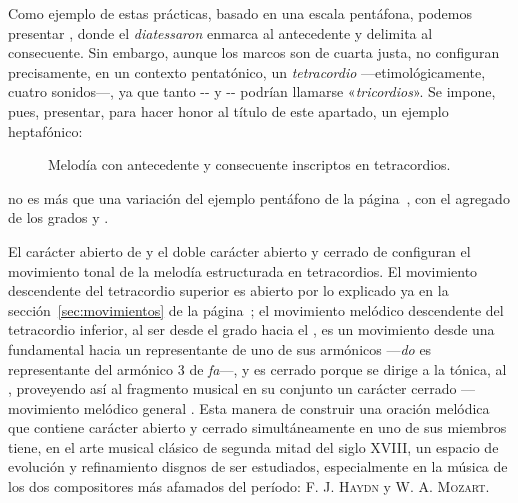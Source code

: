 \documentclass[a4paper,10pt]{article}
\begin{document}
\begin{multicols}{2}
  Como ejemplo de estas prácticas, basado en una escala pentáfona, podemos presentar
  \hbox{,}\label{ej:tetra-penta} donde el \emph{diatessaron}  enmarca al antecedente y  delimita al consecuente. Sin embargo, aunque los marcos son de cuarta justa, no configuran precisamente, en un contexto pentatónico, un \emph{tetracordio} ---etimológicamente, cuatro sonidos---, ya que tanto -- y -- podrían llamarse «\emph{tricordios}». Se impone, pues, presentar, para hacer honor al título de este apartado, un ejemplo heptafónico:
  \end{multicols}

  \begin{figure}[ht]
\centering
{}
\caption{Melodía con antecedente y consecuente inscriptos en tetracordios.}\label{fig:tetra-hepta}
\end{figure}

\begin{multicols}{2}
  \noindent no es más que una variación del ejemplo pentáfono de la página~\pageref{ej:tetra-penta}, con el agregado de los grados  y .

  El carácter abierto de  y el doble carácter abierto y cerrado de  configuran el movimiento tonal de la melodía estructurada en tetracordios. El movimiento descendente del tetracordio superior es abierto por lo explicado ya en la sección~\ref{sec:movimientos} de la página~\pageref{sec:movimientos}; el movimiento melódico descendente del tetracordio inferior, al ser desde el  grado hacia el , es un movimiento desde una fundamental hacia un representante de uno de sus armónicos ---\emph{do} es representante del armónico 3 de \emph{fa}---, y es cerrado porque se dirige a la tónica, al , proveyendo así al fragmento musical en su conjunto un carácter cerrado ---movimiento melódico general . Esta manera de construir una oración melódica que contiene carácter abierto y cerrado simultáneamente en uno de sus miembros tiene, en el arte musical clásico de segunda mitad del siglo XVIII, un espacio de evolución y refinamiento disgnos de ser estudiados, especialmente en la música de los dos compositores más afamados del período: \textsc{F. J. Haydn} y \textsc{W. A. Mozart}.
\end{multicols}
\end{document}
